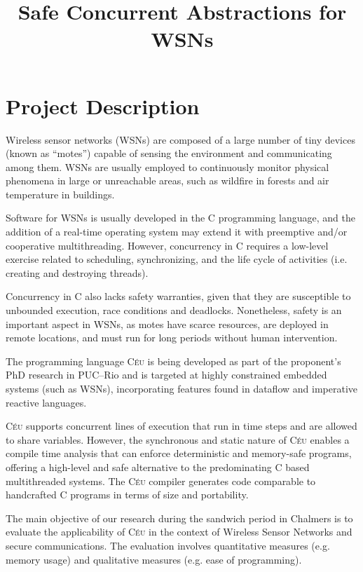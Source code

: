 \documentclass[pdftex,12pt,a4paper]{article}
\title{Safe Concurrent Abstractions for WSNs}
\date{\vspace{-5ex}}
\newcommand{\CEU}{\textsc{C\'{e}u}}
\begin{document}
\maketitle

\section{Project Description}

Wireless sensor networks (WSNs) are composed of a large number of tiny devices 
(known as ``motes'') capable of sensing the environment and communicating among 
them.
WSNs are usually employed to continuously monitor physical phenomena in large 
or unreachable areas, such as wildfire in forests and air temperature in 
buildings.

Software for WSNs is usually developed in the C programming language, and the 
addition of a real-time operating system may extend it with preemptive and/or 
cooperative multithreading.
However, concurrency in C requires a low-level exercise related to scheduling, 
synchronizing, and the life cycle of activities (i.e. creating and destroying 
threads).

Concurrency in C also lacks safety warranties, given that they are susceptible 
to unbounded execution, race conditions and deadlocks.
Nonetheless, safety is an important aspect in WSNs, as motes have scarce 
resources, are deployed in remote locations, and must run for long periods 
without human intervention.

The programming language \CEU{} is being developed as part of the proponent's 
PhD research in PUC--Rio and is targeted at highly constrained embedded systems 
(such as WSNs), incorporating features found in dataflow and imperative 
reactive languages.

\CEU{} supports concurrent lines of execution that run in time steps and are 
allowed to share variables.
However, the synchronous and static nature of \CEU{} enables a compile time 
analysis that can enforce deterministic and memory-safe programs, offering a 
high-level and safe alternative to the predominating C based multithreaded 
systems.
The \CEU{} compiler generates code comparable to handcrafted C programs in 
terms of size and portability.

The main objective of our research during the sandwich period in Chalmers is to 
evaluate the applicability of \CEU{} in the context of Wireless Sensor Networks 
and secure communications.
The evaluation involves quantitative measures (e.g. memory usage) and
qualitative measures (e.g. ease of programming).
\end{document}
